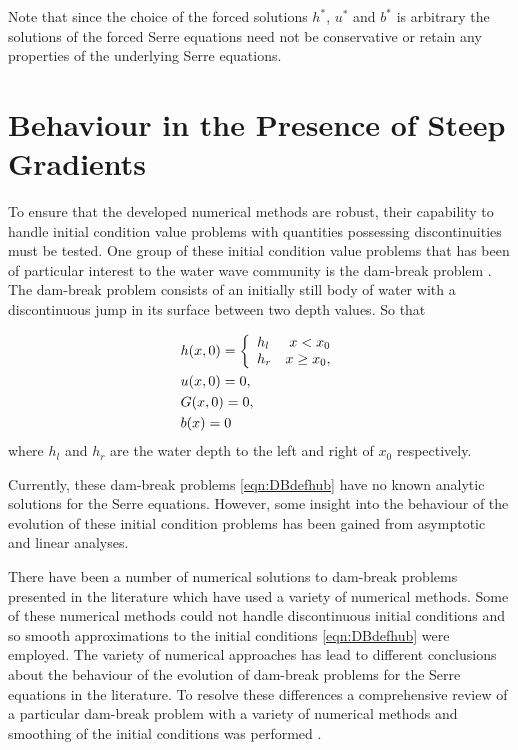 Note that since the choice of the forced solutions $h^*$, $u^*$ and $b^*$ is arbitrary the solutions of the forced Serre equations need not be conservative or retain any properties of the underlying Serre equations. 


\section{Behaviour in the Presence of Steep Gradients}
To ensure that the developed numerical methods are robust, their capability to handle initial condition value problems with quantities possessing discontinuities must be tested. One group of these initial condition value problems that has been of particular interest to the water wave community is the dam-break problem \cite{El-etal-2006,Hank-etal-2010-2034,Mitsotakis-etal-2014,Mitsotakis-etal-2017,doCarmo-etal-2018-404}. The dam-break problem consists of an initially still body of water with a discontinuous jump in its surface between two depth values. So that

\begin{subequations}
	\begin{align}
	&h(x,0) =\left\lbrace \begin{array}{l r}
	h_l & x < x_0 \\
	h_r & x \ge x_0,
	\end{array} \right. \\
	&u(x,0) = 0 , \\
	&G(x,0) = 0 , \\
	&b(x) = 0
	\end{align}
	\label{eqn:DBdefhub}
\end{subequations} 
where $h_l$ and $h_r$ are the water depth to the left and right of $x_0$ respectively. 

Currently, these dam-break problems \eqref{eqn:DBdefhub} have no known analytic solutions for the Serre equations. However, some insight into the behaviour of the evolution of these initial condition problems has been gained from asymptotic \cite{El-etal-2006} and linear \cite{Dougalis-etal-2007} analyses. 

There have been a number of numerical solutions to dam-break problems presented in the literature \cite{El-etal-2006,Hank-etal-2010-2034,Mitsotakis-etal-2014,Mitsotakis-etal-2017,doCarmo-etal-2018-404} which have used a variety of numerical methods. Some of these numerical methods could not handle discontinuous initial conditions \cite{El-etal-2006,Mitsotakis-etal-2014,Mitsotakis-etal-2017,doCarmo-etal-2018-404} and so smooth approximations to the initial conditions \eqref{eqn:DBdefhub} were employed. The variety of numerical approaches has lead to different conclusions about the behaviour of the evolution of dam-break problems for the Serre equations in the literature. To resolve these differences a comprehensive review of a particular dam-break problem with a variety of numerical methods and smoothing of the initial conditions was performed \cite{Pitt-2018-61}. 

